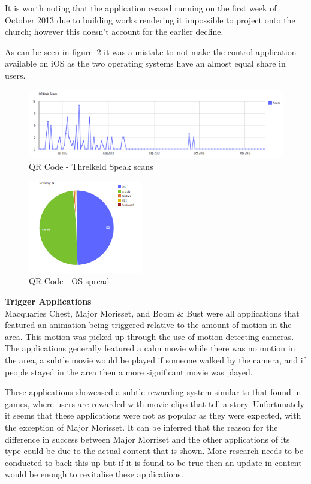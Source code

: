 \documentclass[a4paper,12pt]{article}
\begin{document}
It is worth noting that the application ceased running on the first week of October 2013 due to building works rendering it impossible to project onto the church; however this doesn't account for the earlier decline.

As can be seen in figure~\ref{QR-OS-access} it was a mistake to not make the control application available on iOS as the two operating systems have an almost equal share in users.
\begin{figure}[ht!]
	\centering
	\includegraphics[width=150mm]{./images/threkeld-scans}
	\caption{QR Code - Threlkeld Speak scans}
	\label{QR-threkeld}
\end{figure}

\begin{figure}[ht!]
	\centering
	\includegraphics[width=50mm]{./images/OSAccess}
	\caption{QR Code - OS spread}
	\label{QR-OS-access}
\end{figure}

\par
\textbf{Trigger Applications}\\
Macquaries Chest, Major Morisset, and Boom \& Bust were all applications that featured an animation being triggered relative to the amount of motion in the area. 
This motion was picked up through the use of motion detecting cameras. 
The applications generally featured a calm movie while there was no motion in the area, a subtle movie would be played if someone walked by the camera, and if people stayed in the area then a more significant movie was played.

These applications showcased a subtle rewarding system similar to that found in games, where users are rewarded with movie clips that tell a story. 
Unfortunately it seems that these applications were not as popular as they were expected, with the exception of Major Morisset. 
It can be inferred that the reason for the difference in success between Major Morriset and the other applications of its type could be due to the actual content that is shown.
More research needs to be conducted to back this up but if it is found to be true then an update in content would be enough to revitalise these applications.
\end{document}
